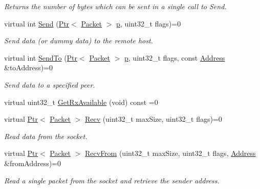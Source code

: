 \begin{DoxyCompactItemize}
\begin{DoxyCompactList}\small\item\em Returns the number of bytes which can be sent in a single call to Send. \end{DoxyCompactList}\item 
virtual int \hyperlink{classns3_1_1Socket_a036901c8f485fe5b6eab93b7f2ec289d}{Send} (\hyperlink{classns3_1_1Ptr}{Ptr}$<$ \hyperlink{classns3_1_1Packet}{Packet} $>$ \hyperlink{lte__link__budget__x2__handover__measures_8m_ac9de518908a968428863f829398a4e62}{p}, uint32\+\_\+t flags)=0
\begin{DoxyCompactList}\small\item\em Send data (or dummy data) to the remote host. \end{DoxyCompactList}\item 
virtual int \hyperlink{classns3_1_1Socket_af898fce6a58e0dbba23c1c6de1d4220e}{Send\+To} (\hyperlink{classns3_1_1Ptr}{Ptr}$<$ \hyperlink{classns3_1_1Packet}{Packet} $>$ \hyperlink{lte__link__budget__x2__handover__measures_8m_ac9de518908a968428863f829398a4e62}{p}, uint32\+\_\+t flags, const \hyperlink{classns3_1_1Address}{Address} \&to\+Address)=0
\begin{DoxyCompactList}\small\item\em Send data to a specified peer. \end{DoxyCompactList}\item 
virtual uint32\+\_\+t \hyperlink{classns3_1_1Socket_ad35d8931e53ae0754ee864acb1cecd0e}{Get\+Rx\+Available} (void) const =0
\item 
virtual \hyperlink{classns3_1_1Ptr}{Ptr}$<$ \hyperlink{classns3_1_1Packet}{Packet} $>$ \hyperlink{classns3_1_1Socket_a8949b1f844aae563446f2f4c5be8827a}{Recv} (uint32\+\_\+t max\+Size, uint32\+\_\+t flags)=0
\begin{DoxyCompactList}\small\item\em Read data from the socket. \end{DoxyCompactList}\item 
virtual \hyperlink{classns3_1_1Ptr}{Ptr}$<$ \hyperlink{classns3_1_1Packet}{Packet} $>$ \hyperlink{classns3_1_1Socket_af22378d7af9a2745a9eada20210da215}{Recv\+From} (uint32\+\_\+t max\+Size, uint32\+\_\+t flags, \hyperlink{classns3_1_1Address}{Address} \&from\+Address)=0
\begin{DoxyCompactList}\small\item\em Read a single packet from the socket and retrieve the sender address. \end{DoxyCompactList}\item 

\end{DoxyCompactItemize}
